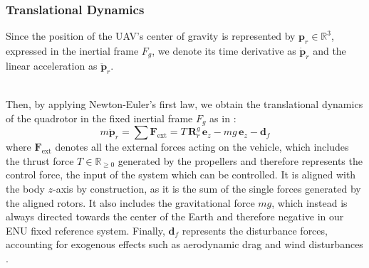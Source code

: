 \documentclass[main]{subfiles}
\begin{document}
\subsubsection{Translational Dynamics}
Since the position of the UAV's center of gravity is represented by \( \mathbf{p}_r \in \mathbb{R}^3 \), 
expressed in the inertial frame \( F_g \), we denote its time derivative as \( \dot{\mathbf{p}}_r \) and 
the linear acceleration as \( \ddot{\mathbf{p}}_r \).

\noindent\\
Then, by applying Newton-Euler's first law, we obtain the 
translational dynamics of the quadrotor in the fixed inertial frame $F_g$ as in \cite{simplified_model}:
\begin{equation}
m \ddot{\mathbf{p}}_r = \sum \mathbf{F}_{\text{ext}} 
= T \, \mathbf{R}_r^g \, \mathbf{e}_z - m g \, \mathbf{e}_z - \mathbf{d}_f
\label{eq:translational_dyn}
\end{equation}
where \( \mathbf{F}_{\text{ext}} \) denotes all the external forces acting on the vehicle, which
includes the thrust force \( T \in \mathbb{R}_{\geq 0} \) generated by the propellers and therefore  
represents the control force, the input of the system which can be controlled.
It is aligned with the body \( z \)-axis by construction, as it is the sum of the single
forces generated by the aligned rotors. 
It also includes the gravitational force \( m g \), which instead is always directed towards the center of 
the Earth and therefore negative in our ENU fixed reference system. 
Finally, \( \mathbf{d}_f \) represents the disturbance forces, accounting for exogenous effects such as 
aerodynamic drag and wind disturbances \cite{control_quadrotor_main}.
\end{document}
